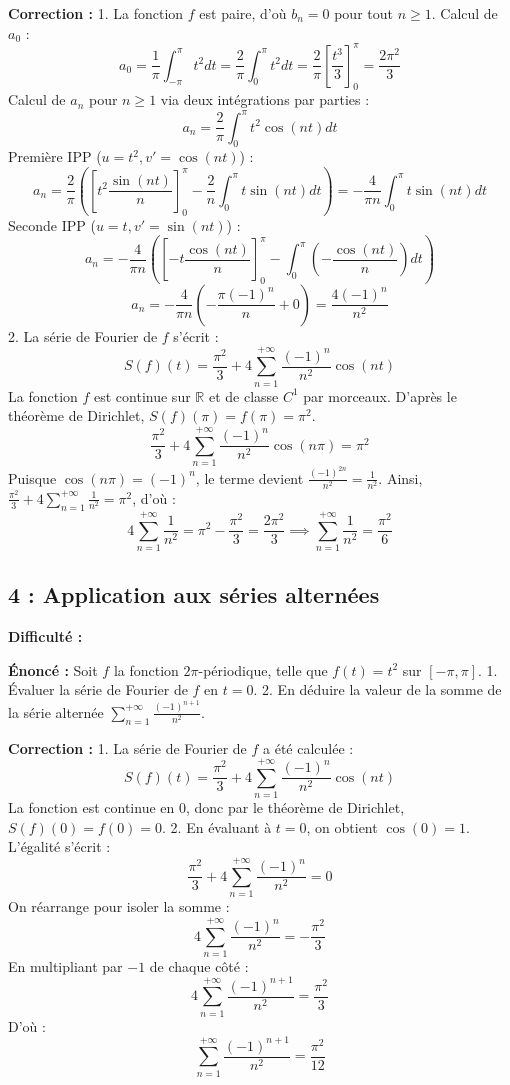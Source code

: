 \documentclass[12pt,a4paper]{article}
\begin{document}
\textbf{Correction :}
1. La fonction $f$ est paire, d'où $b_n = 0$ pour tout $n \ge 1$.
   Calcul de $a_0$ :
   $$a_0 = \frac{1}{\pi} \int_{-\pi}^\pi t^2 dt = \frac{2}{\pi} \int_0^\pi t^2 dt = \frac{2}{\pi} \left[ \frac{t^3}{3} \right]_0^\pi = \frac{2\pi^2}{3}$$
   Calcul de $a_n$ pour $n \ge 1$ via deux intégrations par parties :
   $$a_n = \frac{2}{\pi} \int_0^\pi t^2 \cos(nt) dt$$
   Première IPP ($u=t^2, v'=\cos(nt)$) :
   $$a_n = \frac{2}{\pi} \left( \left[ t^2 \frac{\sin(nt)}{n} \right]_0^\pi - \frac{2}{n} \int_0^\pi t \sin(nt) dt \right) = -\frac{4}{\pi n} \int_0^\pi t \sin(nt) dt$$
   Seconde IPP ($u=t, v'=\sin(nt)$) :
   $$a_n = -\frac{4}{\pi n} \left( \left[ -t \frac{\cos(nt)}{n} \right]_0^\pi - \int_0^\pi \left(-\frac{\cos(nt)}{n}\right) dt \right)$$
   $$a_n = -\frac{4}{\pi n} \left( -\frac{\pi (-1)^n}{n} + 0 \right) = \frac{4(-1)^n}{n^2}$$
2. La série de Fourier de $f$ s'écrit :
   $$S(f)(t) = \frac{\pi^2}{3} + 4 \sum_{n=1}^{+\infty} \frac{(-1)^n}{n^2} \cos(nt)$$
   La fonction $f$ est continue sur $\mathbb{R}$ et de classe $C^1$ par morceaux. D'après le théorème de Dirichlet, $S(f)(\pi) = f(\pi) = \pi^2$.
   $$\frac{\pi^2}{3} + 4 \sum_{n=1}^{+\infty} \frac{(-1)^n}{n^2} \cos(n\pi) = \pi^2$$
   Puisque $\cos(n\pi) = (-1)^n$, le terme devient $\frac{(-1)^{2n}}{n^2} = \frac{1}{n^2}$.
   Ainsi, $\frac{\pi^2}{3} + 4 \sum_{n=1}^{+\infty} \frac{1}{n^2} = \pi^2$, d'où :
   $$4 \sum_{n=1}^{+\infty} \frac{1}{n^2} = \pi^2 - \frac{\pi^2}{3} = \frac{2\pi^2}{3} \implies \sum_{n=1}^{+\infty} \frac{1}{n^2} = \frac{\pi^2}{6}$$


\subsection*{4 : Application aux séries alternées}

\textbf{Difficulté :} \bigstar\bigstar\star\star\star

\textbf{Énoncé :}
Soit $f$ la fonction $2\pi$-périodique, telle que $f(t) = t^2$ sur $[-\pi, \pi]$.
1. Évaluer la série de Fourier de $f$ en $t=0$.
2. En déduire la valeur de la somme de la série alternée $\sum_{n=1}^{+\infty} \frac{(-1)^{n+1}}{n^2}$.

\textbf{Correction :}
1. La série de Fourier de $f$ a été calculée :
   $$S(f)(t) = \frac{\pi^2}{3} + 4 \sum_{n=1}^{+\infty} \frac{(-1)^n}{n^2} \cos(nt)$$
   La fonction est continue en $0$, donc par le théorème de Dirichlet, $S(f)(0) = f(0) = 0$.
2. En évaluant à $t=0$, on obtient $\cos(0) = 1$. L'égalité s'écrit :
   $$\frac{\pi^2}{3} + 4 \sum_{n=1}^{+\infty} \frac{(-1)^n}{n^2} = 0$$
   On réarrange pour isoler la somme :
   $$4 \sum_{n=1}^{+\infty} \frac{(-1)^n}{n^2} = -\frac{\pi^2}{3}$$
   En multipliant par $-1$ de chaque côté :
   $$4 \sum_{n=1}^{+\infty} \frac{(-1)^{n+1}}{n^2} = \frac{\pi^2}{3}$$
   D'où :
   $$\sum_{n=1}^{+\infty} \frac{(-1)^{n+1}}{n^2} = \frac{\pi^2}{12}$$
\end{document}
